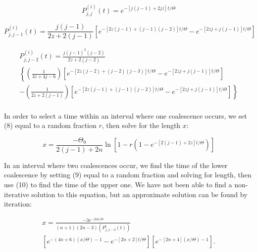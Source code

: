\documentclass[12pt]{article}
\begin{document}
\begin{large}
\begin{equation}
P_{j,j}^{(i)}(t)= e^{-[j(j-1)+2jz]t/\Theta } 
\end{equation}

\begin{equation}
P_{j,j-1}^{(i)}(t)= 
\frac{j(j-1)}{2z+2(j-1)}[e^{-[2z(j-1)+(j-1)(j-2)]t/\Theta}-e^{-[2zj+j(j-1)]t/\Theta}] 
\end{equation}

\begin{equation}
\begin{array}{l}
P_{j,j-2}^{(i)}(t)= \frac{j(j-1)^2(j-2)}{2z+2(j-2)} \\
\left\{\left(\frac{1}{4z+4j-6}\right)[e^{-[2z(j-2)+(j-2)(j-3)]t/\Theta} 
-  e^{-[2zj+j(j-1)]t/\Theta}] \right. \\
\left.-\left(\frac{1}{2z+2(j-1)}\right)[e^{-[2z(j-1)+(j-1)(j-2)]t/\Theta} - 
e^{-[2zj+j(j-1)]t/\Theta}]\right\} \\
\end{array}
\end{equation}

\end{large}

\bigskip

In order to select a time within an interval where one coalescence
occurs, we set (8) equal to a random fraction $r$, then 
solve for the length $x$:

\begin{Large}
\begin{equation}
x=\frac{-\Theta_0}{2(j-1)+2n}\ln{\left [ 1-r(1-e^{-[2(j-1)+2z]t/\Theta})
\right ]}
\end{equation}
\end{Large}

\medskip

In an interval where two coalescences occur, we find the time of the
lower coalescence by setting (9) equal to a random fraction and solving
for length, then use
(10) to find the time of the upper one.  We have not
been able to find a non-iterative solution to this equation, but an
approximate solution can be found by iteration:

\begin{Large}
\begin{equation}
\begin{array}{l}
x=\frac{-3e^{-2nt/\Theta}}{(n+1)(2n-3)(P_{j,j-2}^i(t))} \\
\left [e^{-(4n+6)(x/\Theta)-1}-e^{-[2n+2]t/\Theta} \right ] 
\left [e^{-[2n+4](x/\Theta)-1} \right ]. \\
\end{array}
\end{equation}
\end{Large}
\end{document}
